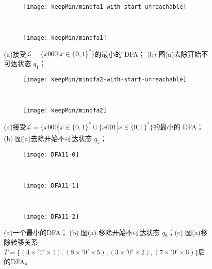 \begin{figure}[!htbp]
    \centering
    \begin{subfigure}[b]{0.7\textwidth}
        \texttt{[image: keepMin/mindfa1-with-start-unreachable]}
        \caption{}
        \label{fig:keepMin-1-unreachable}
    \end{subfigure}
    \\
    \begin{subfigure}[b]{0.7\textwidth}
        \texttt{[image: keepMin/mindfa1]}
        \caption{}
        \label{fig:keepMin-1-nonTheState}
    \end{subfigure}
    \caption{(a)接受{$\mathcal{L}=\{ x000 | x \in \{ 0,1\}^{*} \}$}的最小的 DFA；  (b) 图(a)去除开始不可达状态 {$q_1$}； }
    \label{fig:keepMin-1}
\end{figure}

\begin{figure}[!htbp]
    \centering
    \begin{subfigure}[b]{0.7\textwidth}
        \texttt{[image: keepMin/mindfa2-with-start-unreachable]}
        \caption{}
        \label{fig:keepMin-2-unreachable}
    \end{subfigure}
    \\
    \begin{subfigure}[b]{0.7\textwidth}
        \texttt{[image: keepMin/mindfa2]}
        \caption{}
        \label{fig:keepMin-2-nonTheState}
    \end{subfigure}
    \caption{(a)接受{$\mathcal{L}=\{ x000 | x \in \{ 0,1\}^{*} \cup \{ x001 | x \in \{ 0,1\}^{*} \}$}的最小的 DFA；  (b) 图(a)去除开始不可达状态 {$q_5$}； }
    \label{fig:keepMin-2}
\end{figure}

\begin{figure}[!htbp]
    \centering
    \begin{subfigure}[b]{0.9\textwidth}
        \texttt{[image: DFA11-0]}
        \caption{}
        \label{fig:DFA11-0}
    \end{subfigure}
    \\
    \begin{subfigure}[b]{0.9\textwidth}
        \texttt{[image: DFA11-1]}
        \caption{}
        \label{fig:DFA11-1}
    \end{subfigure}
    \\
    \begin{subfigure}[b]{0.9\textwidth}
        \texttt{[image: DFA11-2]}
        \caption{}
        \label{fig:DFA11-2}
    \end{subfigure}
    \caption{(a)一个最小的DFA；  (b) 图(a) 移除开始不可达状态 {$q_9$}；(c) 图(a)移除转移关系$T=\{(4 \times '1' \times 1),(8 \times '0' \times 5),(3 \times '0' \times 2),(7 \times '0' \times 6)\}$后的DFA。 }
    \label{fig:DFA11}
  \end{figure}